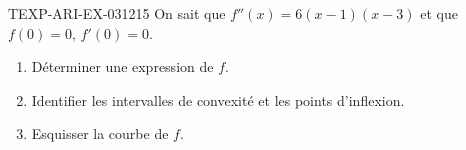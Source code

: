 \begin{exercice}{TEXP-ARI-EX-031}{2}{15}
On sait que $f''(x) = 6(x-1)(x-3)$ et que $f(0) = 0$, $f'(0) = 0$.
\begin{enumerate}
  \item Déterminer une expression de $f$.
  \item Identifier les intervalles de convexité et les points d'inflexion.
  \item Esquisser la courbe de $f$.
\end{enumerate}

\end{exercice}
